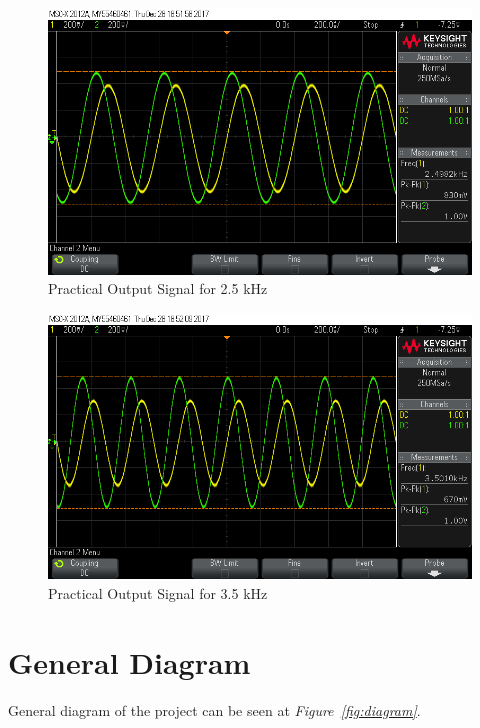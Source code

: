 \documentclass[paper]{IEEEtran}
\begin{document}
\begin{figure}[h!]
	\setlength{\unitlength}{\textwidth}
	\center 
	\includegraphics[width=0.45\unitlength]{lpf_osc4.png}
	\caption{\label{fig:lpfosc4}Practical Output Signal for 2.5 kHz}
\end{figure} 
	

\begin{figure}[h!]
	\setlength{\unitlength}{\textwidth}
	\center 
	\includegraphics[width=0.45\unitlength]{lpf_osc5.png}
	\caption{\label{fig:lpfosc5}Practical Output Signal for 3.5 kHz}
\end{figure} 
		

		
\section{General Diagram}

	General diagram of the project can be seen at \textit{Figure~\ref{fig:diagram}}.
\end{document}
